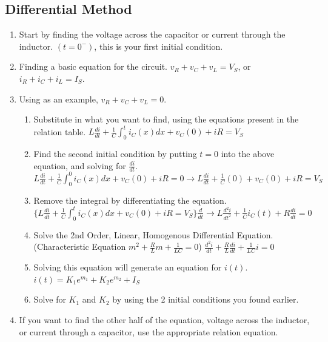 \documentclass[10pt,letterpaper,final,twoside,notitlepage]{article}
\begin{document}
	\subsection*{Differential Method}
		\begin{enumerate}
			\item Start by finding the voltage across the capacitor or current through the inductor. $\left(t=0^-\right)$, this is your first initial condition.
			\item Finding a basic equation for the circuit. $v_R+v_C+v_L=V_S$, or $i_R+i_C+i_L=I_S$.
			\item  Using as an example, $v_R+v_C+v_L=0$.
			\begin{enumerate}
				\item Substitute in what you want to find, using the equations present in the relation table. \newline 
				$L\frac{di}{dt}+\frac{1}{C}\int_{0}^{t}i_{C}(x)dx+v_{C}(0)+iR=V_S$
				\item Find the second initial condition by putting $t=0$ into the above equation, and solving for $\frac{di}{dt}$. \newline
				$L\frac{di}{dt}+\frac{1}{C}\int_{0}^{0}i_{C}(x)dx+v_{C}(0)+iR=0 \longrightarrow L\frac{di}{dt}+\frac{1}{C}(0)+v_C(0)+iR=V_S$
				\item Remove the integral by differentiating the equation. \newline
				$\lbrace L\frac{di}{dt}+\frac{1}{C}\int_{0}^{t}i_{C}(x)dx+v_{C}(0)+iR=V_S\rbrace \frac{d}{dt} \longrightarrow L\frac{d^2i}{dt^2}+\frac{1}{C}i_{C}(t)+R\frac{di}{dt}=0$
				\item Solve the 2nd Order, Linear, Homogenous Differential Equation. (Characteristic Equation $m^2+\frac{R}{L}m+\frac{1}{LC}=0$)\newline
				$\frac{d^2i}{dt}+\frac{R}{L}\frac{di}{dt}+\frac{1}{LC}i=0$
				\item Solving this equation will generate an equation for $i(t)$.\newline
				$i(t)=K_1e^{m_1}+K_2e^{m_2}+I_S$
				\item Solve for $K_1$ and $K_2$ by using the 2 initial conditions you found earlier.
			\end{enumerate}
			\item If you want to find the other half of the equation, voltage across the inductor, or current through a capacitor, use the appropriate relation equation.
		\end{enumerate}
	
\end{document}
